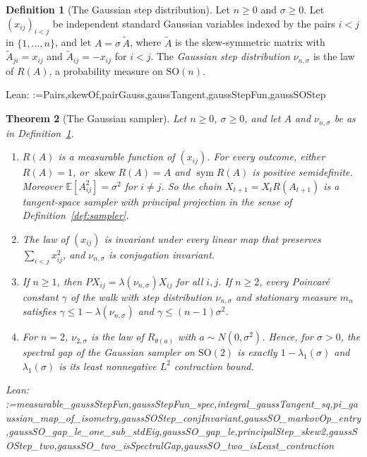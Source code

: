 \documentclass[11pt]{amsart}
\makeatletter
\newtheorem{theorem}{Theorem}[section]
\theoremstyle{definition}
\newtheorem{definition}[theorem]{Definition}
\theoremstyle{remark}
\newcommand{\@leanlist}[1]{\def\@leansep{}\@for\@leanname:=#1\do{\@leansep
  \texttt{\expandafter\detokenize\expandafter{\@leanname}}\def\@leansep{, }}}
\newcommand{\lean}[1]{\par\smallskip\noindent
  {\footnotesize\normalfont\raggedright\textsf{Lean:} \@leanlist{#1}\par}}
\newcommand{\E}{\mathbb{E}}
\newcommand{\SO}{\mathrm{SO}}
\newcommand{\sym}{\operatorname{sym}}
\newcommand{\skw}{\operatorname{skew}}
\makeatother
\begin{document}
\begin{definition}[The Gaussian step distribution]\label{def:gauss-step}
Let $n\ge0$ and $\sigma\ge0$.  Let $(x_{ij})_{i<j}$ be independent standard Gaussian variables
indexed by the pairs $i<j$ in $\{1,\dots,n\}$, and let $A=\sigma\,\tilde A$, where $\tilde A$ is
the skew-symmetric matrix with $\tilde A_{ji}=x_{ij}$ and $\tilde A_{ij}=-x_{ij}$ for $i<j$.
The \emph{Gaussian step distribution} $\nu_{n,\sigma}$ is the law of $R(A)$, a probability
measure on $\SO(n)$.
\lean{Pairs,skewOf,pairGauss,gaussTangent,gaussStepFun,gaussSOStep}
\end{definition}

\begin{theorem}[The Gaussian sampler]\label{thm:gauss-sampler}
Let $n\ge0$, $\sigma\ge0$, and let $A$ and $\nu_{n,\sigma}$ be as in
Definition~\ref{def:gauss-step}.
\begin{enumerate}
\item[(a)] $R(A)$ is a measurable function of $(x_{ij})$.  For every outcome, either
$R(A)=1$, or $\skw R(A)=A$ and $\sym R(A)$ is positive semidefinite.  Moreover
$\E[A_{ij}^2]=\sigma^2$ for $i\ne j$.  So the chain $X_{t+1}=X_tR(A_{t+1})$ is a tangent-space
sampler with principal projection in the sense of Definition~\ref{def:sampler}.
\item[(b)] The law of $(x_{ij})$ is invariant under every linear map that preserves
$\sum_{i<j}x_{ij}^2$, and $\nu_{n,\sigma}$ is conjugation invariant.
\item[(c)] If $n\ge1$, then $P X_{ij}=\lambda(\nu_{n,\sigma})X_{ij}$ for all $i,j$.  If
$n\ge2$, every Poincar\'e constant $\gamma$ of the walk with step distribution $\nu_{n,\sigma}$
and stationary measure $m_n$ satisfies $\gamma\le1-\lambda(\nu_{n,\sigma})$ and
$\gamma\le(n-1)\sigma^2$.
\item[(d)] For $n=2$, $\nu_{2,\sigma}$ is the law of $R_{\theta(a)}$ with $a\sim N(0,\sigma^2)$.
Hence, for $\sigma>0$, the spectral gap of the Gaussian sampler on $\SO(2)$ is exactly
$1-\lambda_1(\sigma)$ and $\lambda_1(\sigma)$ is its least nonnegative $L^2$ contraction bound.
\end{enumerate}
\lean{measurable_gaussStepFun,gaussStepFun_spec,integral_gaussTangent_sq,pi_gaussian_map_of_isometry,gaussSOStep_conjInvariant,gaussSO_markovOp_entry,gaussSO_gap_le_one_sub_stdEig,gaussSO_gap_le,principalStep_skew2,gaussSOStep_two,gaussSO_two_isSpectralGap,gaussSO_two_isLeast_contraction}
\end{theorem}
\end{document}
